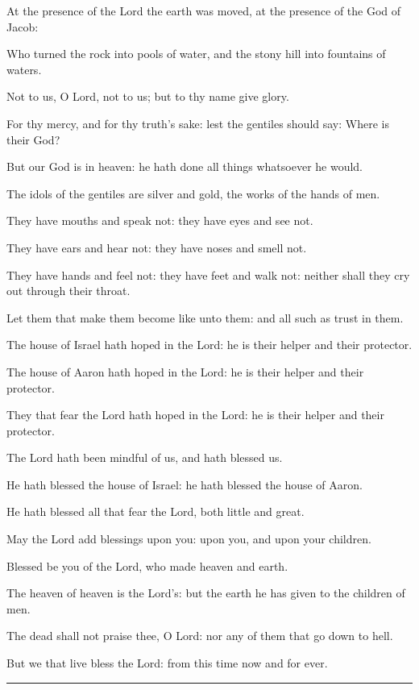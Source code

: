 \documentclass[letterpaper,12pt]{article} %
\begin{document}
\begin{parcolumns}[colwidths={1=268pt},rulebetween]{2}
{\begin{psalmverses}[0]
\item At the presence of the Lord the earth was moved, at the presence of the God of Jacob:
\item Who turned the rock into pools of water, and the stony hill into fountains of waters.
\item Not to us, O Lord, not to us; but to thy name give glory.
\item For thy mercy, and for thy truth's sake: lest the gentiles should say: Where is their God?
\item But our God is in heaven: he hath done all things whatsoever he would.
\item The idols of the gentiles are silver and gold, the works of the hands of men.
\item They have mouths and speak not: they have eyes and see not.
\item They have ears and hear not: they have noses and smell not.
\item They have hands and feel not: they have feet and walk not: neither shall they cry out through their throat.
\item Let them that make them become like unto them: and all such as trust in them.
\item The house of Israel hath hoped in the Lord: he is their helper and their protector.
\item The house of Aaron hath hoped in the Lord: he is their helper and their protector.
\item They that fear the Lord hath hoped in the Lord: he is their helper and their protector.
\item The Lord hath been mindful of us, and hath blessed us.
\item He hath blessed the house of Israel: he hath blessed the house of Aaron.
\item He hath blessed all that fear the Lord, both little and great.
\item May the Lord add blessings upon you: upon you, and upon your children.
\item Blessed be you of the Lord, who made heaven and earth.
\item The heaven of heaven is the Lord's: but the earth he has given to the children of men.
\item The dead shall not praise thee, O Lord: nor any of them that go down to hell.
\item But we that live bless the Lord: from this time now and for ever.
\end{psalmverses}}
\end{parcolumns}
\bigskip
{}%
\large
{}
\bigskip
\hrule
\bigskip
\end{document}
